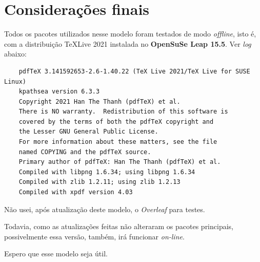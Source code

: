 \chapter{Considerações finais}

Todos os pacotes utilizados nesse modelo foram testados de modo \textit{offline}, isto é, com a distribuição \TeX Live 2021 instalada no \textbf{OpenSuSe Leap 15.5}. Ver \textit{log} abaixo:

\begin{verbatim}
	pdfTeX 3.141592653-2.6-1.40.22 (TeX Live 2021/TeX Live for SUSE Linux)
	kpathsea version 6.3.3
	Copyright 2021 Han The Thanh (pdfTeX) et al.
	There is NO warranty.  Redistribution of this software is
	covered by the terms of both the pdfTeX copyright and
	the Lesser GNU General Public License.
	For more information about these matters, see the file
	named COPYING and the pdfTeX source.
	Primary author of pdfTeX: Han The Thanh (pdfTeX) et al.
	Compiled with libpng 1.6.34; using libpng 1.6.34
	Compiled with zlib 1.2.11; using zlib 1.2.13
	Compiled with xpdf version 4.03
\end{verbatim}

Não usei, após atualização deste modelo, o \textit{Overleaf} para testes.

Todavia, como as atualizações feitas não alteraram os pacotes principais, possivelmente essa versão, também, irá funcionar \textit{on-line}.

Espero que esse modelo seja útil.